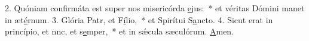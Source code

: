 2. Quóniam confirmáta est super nos misericórda \uline{e}jus:~* et véritas Dómini manet in æt\uline{é}rnum.
3. Glória Patr, et F\uline{í}lio,~* et Spirítui S\uline{a}ncto.
4. Sicut erat in princípio, et nnc, et s\uline{e}mper,~* et in sǽcula sæculórum. \uline{A}men.
